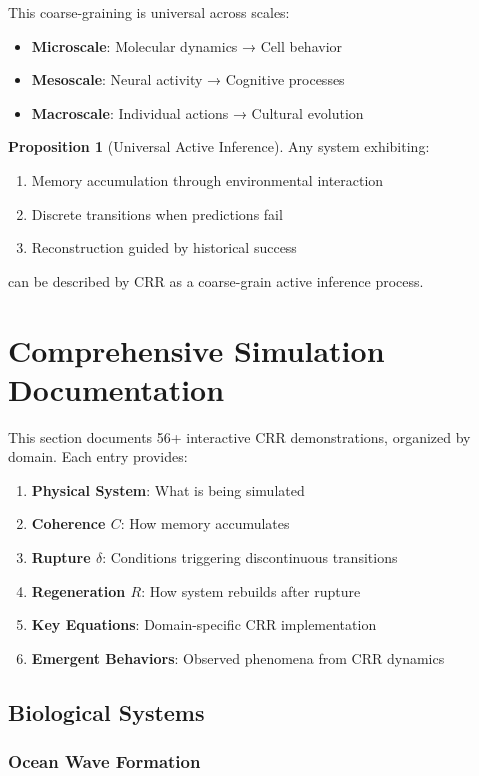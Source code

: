 \documentclass[11pt,a4paper]{article}
\theoremstyle{definition}
\newtheorem{proposition}{Proposition}[section]
\theoremstyle{remark}
\begin{document}
This coarse-graining is universal across scales:
\begin{itemize}
\item \textbf{Microscale}: Molecular dynamics → Cell behavior
\item \textbf{Mesoscale}: Neural activity → Cognitive processes
\item \textbf{Macroscale}: Individual actions → Cultural evolution
\end{itemize}

\begin{proposition}[Universal Active Inference]
Any system exhibiting:
\begin{enumerate}
\item Memory accumulation through environmental interaction
\item Discrete transitions when predictions fail
\item Reconstruction guided by historical success
\end{enumerate}
can be described by CRR as a coarse-grain active inference process.
\end{proposition}

\section{Comprehensive Simulation Documentation}
\label{sec:simulations}

This section documents 56+ interactive CRR demonstrations, organized by domain. Each entry provides:
\begin{enumerate}
\item \textbf{Physical System}: What is being simulated
\item \textbf{Coherence $C$}: How memory accumulates
\item \textbf{Rupture $\delta$}: Conditions triggering discontinuous transitions
\item \textbf{Regeneration $R$}: How system rebuilds after rupture
\item \textbf{Key Equations}: Domain-specific CRR implementation
\item \textbf{Emergent Behaviors}: Observed phenomena from CRR dynamics
\end{enumerate}

\subsection{Biological Systems}

\subsubsection{Ocean Wave Formation}
\label{sec:ocean-waves}
\end{document}
